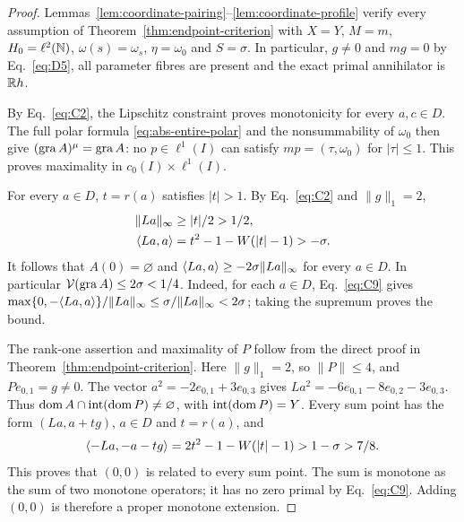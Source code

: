 \begin{proof}
Lemmas~\ref{lem:coordinate-pairing}--\ref{lem:coordinate-profile}
verify every assumption of Theorem~\ref{thm:endpoint-criterion}
with $X=Y$, $M=m$, $H_0=\ell^2(\mathbb N)$, $\omega(s)=\omega_s$,
$\eta=\omega_0$ and $S=\sigma$. In particular, $g\ne0$ and $mg=0$
by Eq.~\eqref{eq:D5}, all parameter fibres are present and the
exact primal annihilator is $\mathbb R h$.

By Eq.~\eqref{eq:C2}, the Lipschitz constraint proves monotonicity
for every $a,c\in D$. The full polar formula
\eqref{eq:abs-entire-polar} and the nonsummability of $\omega_0$
then give $(\operatorname{gra} A)^\mu=\operatorname{gra} A$: no $p\in\ell^1(I)$ can
satisfy $mp=(\tau,\omega_0)$ for $|\tau|\le1$. This proves
maximality in $c_0(I)\times\ell^1(I)$.

\label{sec:C5}
For every $a\in D$, $t=r(a)$ satisfies $|t|>1$. By Eq.~\eqref{eq:C2}
and $\|g\|_1=2$,
\begin{equation}
\begin{aligned}
\|La\|_\infty&\ge|t|/2>1/2,\\
\langle La,a\rangle&=t^2-1-W(|t|-1)>-\sigma.
\end{aligned}
\label{eq:C9}
\end{equation}
It follows that $A(0)=\varnothing$ and
$\langle La,a\rangle\ge-2\sigma\|La\|_\infty$ for every $a\in D$.
In particular $\mathcal V(\operatorname{gra} A)\le2\sigma<1/4$.
Indeed, for each $a\in D$, Eq.~\eqref{eq:C9} gives
$\max\{0,-\langle La,a\rangle\}/\|La\|_\infty
\le\sigma/\|La\|_\infty<2\sigma$; taking the supremum proves the bound.

\label{sec:C6}
The rank-one assertion and maximality of $P$ follow from the direct
proof in Theorem~\ref{thm:endpoint-criterion}. Here $\|g\|_1=2$,
so $\|P\|\le4$, and $Pe_{0,1}=g\ne0$.
The vector $a^2=-2e_{0,1}+3e_{0,3}$ gives
$La^2=-6e_{0,1}-8e_{0,2}-3e_{0,3}$. Thus
$\operatorname{dom} A\cap\operatorname{int}(\operatorname{dom} P)\ne\varnothing$, with
$\operatorname{int}(\operatorname{dom} P)=Y$. Every sum point has the form
$(La,a+tg)$, $a\in D$ and $t=r(a)$, and
\begin{equation}
\langle -La,-a-tg\rangle=2t^2-1-W(|t|-1)>1-\sigma>7/8.
\label{eq:C11}
\end{equation}
This proves that $(0,0)$ is related to every sum point. The sum is
monotone as the sum of two monotone operators; it has no zero primal by
Eq.~\eqref{eq:C9}. Adding $(0,0)$ is therefore a proper monotone extension.

\end{proof}

\label{sec:domain-comparison}

